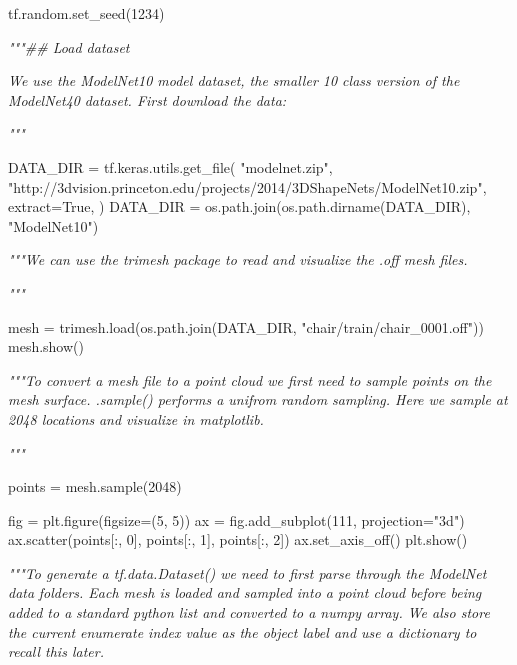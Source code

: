 \documentclass[
  12pt,
  a4paper,
]{article}
\newenvironment{Shaded}{}{}
\newcommand{\CommentTok}[1]{\textcolor[rgb]{0.38,0.63,0.69}{\textit{#1}}}
\newcommand{\DecValTok}[1]{\textcolor[rgb]{0.25,0.63,0.44}{#1}}
\newcommand{\NormalTok}[1]{#1}
\newcommand{\OperatorTok}[1]{\textcolor[rgb]{0.40,0.40,0.40}{#1}}
\newcommand{\StringTok}[1]{\textcolor[rgb]{0.25,0.44,0.63}{#1}}
\newcommand{\VariableTok}[1]{\textcolor[rgb]{0.10,0.09,0.49}{#1}}
\begin{document}
\begin{Shaded}
\begin{Highlighting}[]
\NormalTok{tf.random.set\_seed(}\DecValTok{1234}\NormalTok{)}

\CommentTok{"""\#\# Load dataset}

\CommentTok{We use the ModelNet10 model dataset, the smaller 10 class version of the ModelNet40}
\CommentTok{dataset. First download the data:}

\CommentTok{"""}

\NormalTok{DATA\_DIR }\OperatorTok{=}\NormalTok{ tf.keras.utils.get\_file(}
    \StringTok{"modelnet.zip"}\NormalTok{,}
    \StringTok{"http://3dvision.princeton.edu/projects/2014/3DShapeNets/ModelNet10.zip"}\NormalTok{,}
\NormalTok{    extract}\OperatorTok{=}\VariableTok{True}\NormalTok{,}
\NormalTok{)}
\NormalTok{DATA\_DIR }\OperatorTok{=}\NormalTok{ os.path.join(os.path.dirname(DATA\_DIR), }\StringTok{"ModelNet10"}\NormalTok{)}

\CommentTok{"""We can use the \textasciigrave{}trimesh\textasciigrave{} package to read and visualize the \textasciigrave{}.off\textasciigrave{} mesh files.}

\CommentTok{"""}

\NormalTok{mesh }\OperatorTok{=}\NormalTok{ trimesh.load(os.path.join(DATA\_DIR, }\StringTok{"chair/train/chair\_0001.off"}\NormalTok{))}
\NormalTok{mesh.show()}

\CommentTok{"""To convert a mesh file to a point cloud we first need to sample points on the mesh}
\CommentTok{surface. \textasciigrave{}.sample()\textasciigrave{} performs a unifrom random sampling. Here we sample at 2048 locations}
\CommentTok{and visualize in \textasciigrave{}matplotlib\textasciigrave{}.}

\CommentTok{"""}

\NormalTok{points }\OperatorTok{=}\NormalTok{ mesh.sample(}\DecValTok{2048}\NormalTok{)}

\NormalTok{fig }\OperatorTok{=}\NormalTok{ plt.figure(figsize}\OperatorTok{=}\NormalTok{(}\DecValTok{5}\NormalTok{, }\DecValTok{5}\NormalTok{))}
\NormalTok{ax }\OperatorTok{=}\NormalTok{ fig.add\_subplot(}\DecValTok{111}\NormalTok{, projection}\OperatorTok{=}\StringTok{"3d"}\NormalTok{)}
\NormalTok{ax.scatter(points[:, }\DecValTok{0}\NormalTok{], points[:, }\DecValTok{1}\NormalTok{], points[:, }\DecValTok{2}\NormalTok{])}
\NormalTok{ax.set\_axis\_off()}
\NormalTok{plt.show()}

\CommentTok{"""To generate a \textasciigrave{}tf.data.Dataset()\textasciigrave{} we need to first parse through the ModelNet data}
\CommentTok{folders. Each mesh is loaded and sampled into a point cloud before being added to a}
\CommentTok{standard python list and converted to a \textasciigrave{}numpy\textasciigrave{} array. We also store the current}
\CommentTok{enumerate index value as the object label and use a dictionary to recall this later.}


\end{Highlighting}
\end{Shaded}
\end{document}
